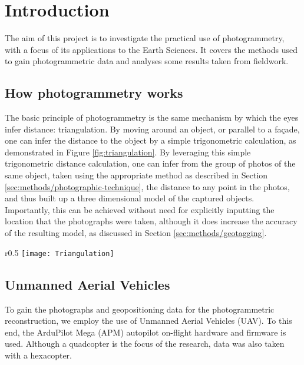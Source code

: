 \section{Introduction}

The aim of this project is to investigate the practical use of photogrammetry,
with a focus of its applications to the Earth Sciences. It covers the methods
used to gain photogrammetric data and analyses some results taken from
fieldwork.

\subsection{How photogrammetry works}

The basic principle of photogrammetry is the same mechanism by which the eyes
infer distance: triangulation. By moving around an object, or parallel to a
façade, one can infer the distance to the object by a simple trigonometric
calculation, as demonstrated in Figure \ref{fig:triangulation}. By leveraging
this simple trigonometric distance calculation, one can infer from the group of
photos of the same object, taken using the appropriate method as described in
Section \ref{sec:methods/photographic-technique}, the distance to any point in
the photos, and thus built up a three dimensional model of the captured objects.
Importantly, this can be achieved without need for explicitly inputting the
location that the photographs were taken, although it does increase the accuracy
of the resulting model, as discussed in Section \ref{sec:methods/geotagging}.

\begin{wrapfigure}{r}{0.5\textwidth}
    \texttt{[image: Triangulation]}
    \caption{By taking photographs of an object from different angles, one can
        use trigonometry to calculate the distance to that object.}
    \label{fig:triangulation}
    \vspace{-30pt}
\end{wrapfigure}

\subsection{Unmanned Aerial Vehicles}

To gain the photographs and geopositioning data for the photogrammetric
reconstruction, we employ the use of Unmanned Aerial Vehicles (UAV). To this
end, the ArduPilot Mega (APM) autopilot
on-flight hardware and firmware is used.  Although a quadcopter is the focus of
the research, data was also taken with a hexacopter.

